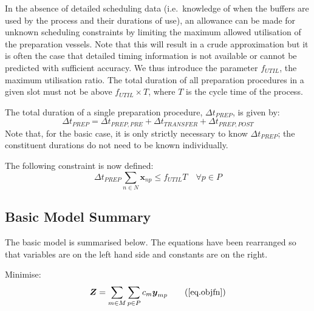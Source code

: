 In the absence of detailed scheduling data (i.e.\ knowledge of when the buffers
are used by the process and their durations of use), an allowance can be made
for unknown scheduling constraints by limiting the maximum allowed utilisation
of the preparation vessels.
Note that this will result in a crude approximation but it is often the case
that detailed timing information is not available or cannot be predicted with
sufficient accuracy.
We thus introduce the parameter $f_{\mathit{UTIL}}$, the maximum utilisation
ratio.
The total duration of all preparation procedures in a given slot must not be
above $f_{\mathit{UTIL}} \times T$, where $T$ is the cycle time of the
process.

The total duration of a single preparation procedure,
$\Delta t_{\mathit{PREP}}$, is given by:
\begin{equation}
    \Delta t_{\mathit{PREP}} = \Delta t_{\mathit{PREP,PRE}} + 
    \Delta t_{\mathit{TRANSFER}} + \Delta t_{\mathit{PREP,POST}}
\end{equation}
Note that, for the basic case, it is only strictly necessary to know
$\Delta t_{\mathit{PREP}}$; the constituent durations do not need to be
known individually.

The following constraint is now defined:
\begin{equation}
    \Delta t_{\mathit{PREP}} \sum_{n \in N} \boldsymbol{x}_{np} \le
    f_{\mathit{UTIL}} T \quad \forall p \in P
    \label{eq.constr4}
\end{equation}

\subsection{Basic Model Summary}\label{SS.basicsummary}

The basic model is summarised below. The equations have been rearranged so that
variables are on the left hand side and constants are on the right.

Minimise:
\begin{equation}
    \boldsymbol{Z} = \sum_{m \in M} \sum_{p \in P} c_m \boldsymbol{y}_{mp}
    \tag{\ref{eq.objfn}}
\end{equation}

